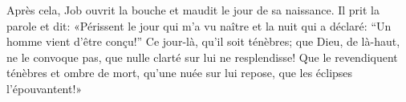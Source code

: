 Après cela, Job ouvrit la bouche et maudit le jour de sa naissance.
Il prit la parole et dit:
	«Périssent le jour qui m’a vu naître et la nuit qui a déclaré:
	“Un homme vient d’être conçu!”
Ce jour-là, qu’il soit ténèbres;
	que Dieu, de là-haut, ne le convoque pas, que nulle clarté sur lui ne resplendisse!
Que le revendiquent ténèbres et ombre de mort,
	qu’une nuée sur lui repose, que les éclipses l’épouvantent!»
